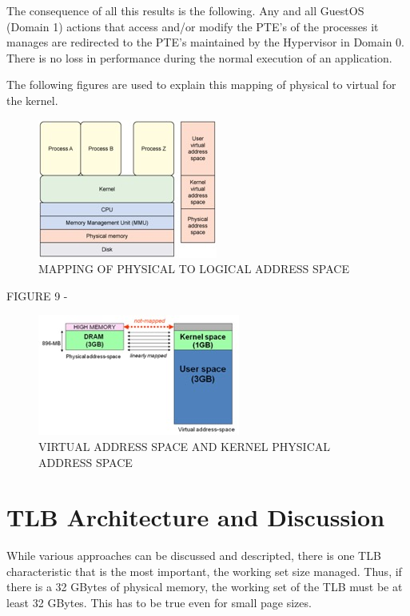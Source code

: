 \documentclass{article}
\begin{document}
The consequence of all this results is the following.  Any and all GuestOS (Domain 1) actions that access and/or modify the PTE’s of the processes it manages are redirected to the PTE’s maintained by the Hypervisor in Domain 0.  There is no loss in performance during the normal execution of an application.

The following figures are used to explain this mapping of physical to virtual for the kernel.

\begin{figure}
\includegraphics [scale = .4]
{figures/figure9mapping_logical_physical.jpg}
\caption{MAPPING OF PHYSICAL TO LOGICAL ADDRESS SPACE}
\end{figure}


FIGURE  9  - 
\newline
\newline

\begin{figure}
\includegraphics[scale = .4]
{figures/figure10_kernel_physical.jpg}
\caption{VIRTUAL ADDRESS SPACE AND KERNEL PHYSICAL ADDRESS SPACE}
\end{figure}


\section{TLB Architecture and Discussion}

While  various approaches can be discussed and descripted,  there is one TLB characteristic that is the most important,  the working set size managed.   Thus, if there is a 32 GBytes of physical memory,  the working set of the TLB must be at least 32 GBytes.  This has to be true even for small page sizes.
\end{document}
